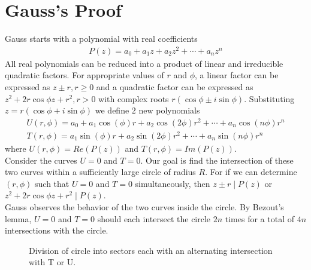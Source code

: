 \documentclass[10pt]{article}
\begin{document}
\section*{Gauss's Proof}
Gauss starts with a polynomial with real coefficients
\begin{align*}
    P(z)=a_0+a_1z+a_2z^2+\cdots+a_n z^n 
\end{align*}
All real polynomials can be reduced into a product of linear and irreducible quadratic factors.
For appropriate values of $r$ and $\phi$, a linear factor can be expressed as $z\pm r,r\ge 0$ and a quadratic factor can be expressed as $z^2+2r\cos\phi z+r^2,r>0$ with complex roots $r(\cos\phi\pm i\sin\phi)$.
Substituting $z=r(\cos\phi+ i\sin\phi)$ we define $2$ new polynomials \begin{align*}
    U(r,\phi)=a_0+a_1\cos(\phi) r+a_2\cos(2\phi) r^2+\cdots+a_n\cos (n\phi) r^n\\
    T(r,\phi)=a_1\sin(\phi) r+a_2\sin(2\phi) r^2+\cdots+a_n\sin (n\phi) r^n
\end{align*}
where $U(r,\phi)=Re(P(z))$ and $T(r,\phi)=Im(P(z))$.\\
Consider the curves $U=0$ and $T=0$. Our goal is find the intersection of these two curves within a sufficiently large circle of radius $R$. For if we can determine $(r,\phi)$ such that $U=0$ and $T=0$ simultaneously, then $z\pm r\mid P(z)$ or $z^2+2r\cos\phi z+r^2\mid P(z)$.\\
Gauss observes the behavior of the two curves inside the circle. By Bezout's lemma, $U=0$ and $T=0$ should each intersect the circle $2n$ times for a total of $4n$ intersections with the circle. 
      \begin{figure}[h]
          \caption{Division of circle into sectors each with an alternating intersection with T or U.}
        \end{figure}
\end{document}
